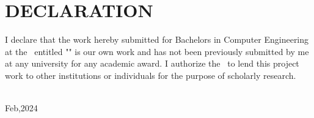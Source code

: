 \section*{DECLARATION}
\vspace{0.5cm}

I declare that the work hereby submitted for Bachelors in Computer Engineering at the \thecampus \ entitled "\textbf{\thetitle}" is our own work and has not been previously submitted by
me at any university for any academic award.
I authorize the \thecampus \ to lend this project work
to other institutions or individuals for the purpose of scholarly research.

\vspace{1cm}
\noindent\textbf{ {\theauthor}}\\
\vspace{1cm}
Feb,2024

